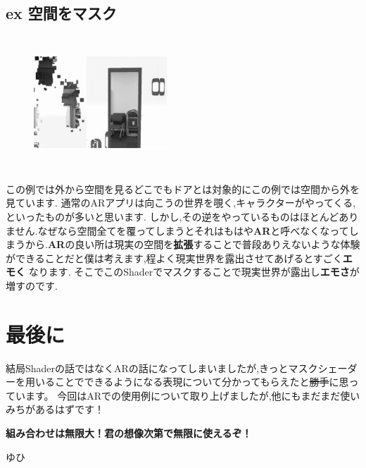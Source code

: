 \subsection{ex 空間をマスク}
\begin{figure}[h]
\centering
\includegraphics[width=5cm,height=5cm]{./assets/yuhiasset/hsau_dosei6.png}
\end{figure}
この例では外から空間を見るどこでもドアとは対象的にこの例では空間から外を見ています.
通常のARアプリは向こうの世界を覗く,キャラクターがやってくる,といったものが多いと思います.
しかし,その逆をやっているものはほとんどありません.なぜなら空間全てを覆ってしまうとそれはもはや{\bf AR}と呼べなくなってしまうから.{\bf AR}の良い所は現実の空間を{\bf 拡張}することで普段ありえないような体験ができることだと僕は考えます,程よく現実世界を露出させてあげるとすごく{\bf エモく}
なります.
そこでこのShaderでマスクすることで現実世界が露出し{\bf エモさ}が増すのです.

\section{最後に}
結局Shaderの話ではなくARの話になってしまいましたが,きっとマスクシェーダーを用いることでできるようになる表現について分かってもらえたと\sout{勝手}に思っています。
今回はARでの使用例について取り上げましたが,他にもまだまだ使いみちがあるはずです！

{\bf 組み合わせは無限大！君の想像次第で無限に使えるぞ！}

ゆひ
